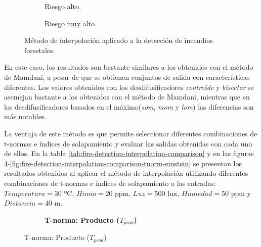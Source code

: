 \begin{figure}[t]
		\vspace{1cm}
		\begin{subfigure}[b]{0.45\textwidth}
			\setlength\figureheight{3cm}
			\setlength\figurewidth{6cm}
			
			\caption{Riesgo alto.}\label{fig:fire-detection-interpolation-high}
		\end{subfigure}
		\qquad
		\begin{subfigure}[b]{0.45\textwidth}
			\setlength\figureheight{3cm}
			\setlength\figurewidth{6cm}
			
			\caption{Riesgo muy alto.}\label{fig:fire-detection-interpolation-very-high}
		\end{subfigure}
	\caption{Método de interpolación aplicado a la detección de incendios forestales.}
	\label{fig:interpolation-fire-detection-example}
\end{figure}

En este caso, los resultados son bastante similares a los obtenidos con el método de Mamdani, a pesar de que se obtienen conjuntos de salida con características diferentes. Los valores obtenidos con los desdifusificadores \emph{centroide} y \emph{bisector} se asemejan bastante a los obtenidos con el método de Mamdani, mientras que en los desdifusificadores basados en el máximo(\emph{som}, \emph{mom} y \emph{lom}) las diferencias son más notables.

La ventaja de este método es que permite seleccionar diferentes combinaciones de t-normas e índices de solapamiento y evaluar las salidas obtenidas con cada uno de ellos. En la tabla \ref{tab:fire-detection-interpolation-comparison} y en las figuras \ref{fig:fire-detection-interpolation-comparison-tnorm-prod}-\ref{fig:fire-detection-interpolation-comparison-tnorm-einstein} se presentan los resultados obtenidos al aplicar el método de interpolación utilizando diferentes combinaciones de t-normas e índices de solapamiento a las entradas: $Temperatura = 30 \text{ ºC}$, $Humo = 20 \text{ ppm}$, $Luz = 500 \text{ lux}$, $Humedad = 50 \text{ ppm}$ y $Distancia = 40 \text{ m}$.

\begin{center}
	\def\arraystretch{1.1}
    
\end{center}

\begin{figure}[h!]
\centering
\begin{subfigure}[b]{\textwidth}
	\textbf{T-norma: Producto ($T_{prod}$)} \\
	\setlength\figureheight{2cm}
	\setlength\figurewidth{7cm}
	
\end{subfigure}
\label{fig:fire-detection-interpolation-comparison-tnorm-prod}
\caption{T-norma: Producto ($T_{prod}$)}
\end{figure}

